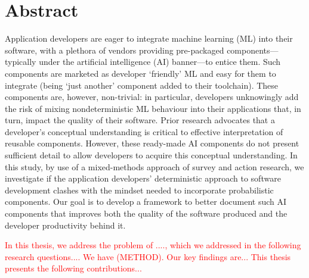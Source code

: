 \chapter*{Abstract}


Application developers are eager to integrate machine learning (ML) into their software, with a plethora of vendors providing pre-packaged components---typically under the artificial intelligence (AI) banner---to entice them.
Such components are marketed as developer `friendly' ML and easy for them to integrate (being `just another' component added to their toolchain). These components are, however, non-trivial: in particular, developers unknowingly add the risk of mixing nondeterministic ML behaviour into their applications that, in turn, impact the quality of their software.
Prior research advocates that a developer's conceptual understanding is critical to effective interpretation of reusable components. However, these ready-made AI components do not present sufficient detail to allow developers to acquire this conceptual understanding.
In this study, by use of a mixed-methods approach of survey and action research, we investigate if the application developers' deterministic approach to software development clashes with the mindset needed to incorporate probabilistic components. Our goal is to develop a framework to better document such AI components that improves both the quality of the software produced and the developer productivity behind it.

\textcolor{red}{In this thesis, we address the problem of ...., which we addressed in the following research questions.... We have (METHOD). Our key findings are...}
\textcolor{red}{This thesis presents the following contributions...}
